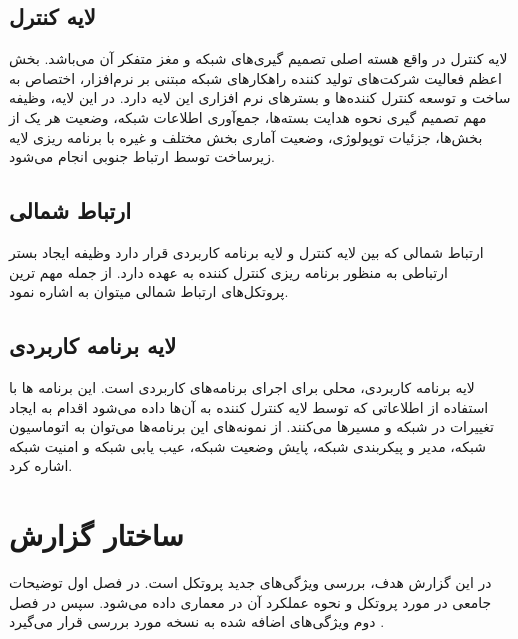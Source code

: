 \subsection{لایه کنترل}
لایه کنترل در واقع هسته اصلی تصمیم گیری‌های شبکه و مغز متفکر آن می‌باشد. بخش اعظم فعالیت شرکت‌های تولید کننده‌ راهکار‌های شبکه‌ مبتنی بر نرم‌افزار، اختصاص به ساخت و توسعه کنترل کننده‌ها و بستر‌های نرم افزاری این لایه دارد. در این لایه، وظیفه مهم تصمیم گیری نحوه هدایت بسته‌ها، جمع‌آوری اطلاعات شبکه، وضعیت هر یک از بخش‌ها، جزئیات توپولوژی، وضعیت آماری بخش مختلف و غیره با برنامه ریزی لایه زیرساخت توسط ارتباط جنوبی انجام می‌شود.

\subsection{ارتباط شمالی}
ارتباط شمالی که بین لایه کنترل و لایه برنامه کاربردی قرار دارد وظیفه ایجاد بستر ارتباطی به منظور برنامه ریزی کنترل کننده به عهده دارد. از جمله مهم ترین پروتکل‌های ارتباط شمالی میتوان به  اشاره نمود.

\subsection{لایه برنامه کاربردی}
لایه برنامه کاربردی، محلی برای اجرای برنامه‌های کاربردی است. این برنامه ها با استفاده از اطلاعاتی که توسط لایه کنترل کننده به آن‌ها داده می‌شود اقدام به ایجاد تغییرات در شبکه و مسیر‌ها می‌کنند. از نمونه‌های این برنامه‌ها می‌توان به اتوماسیون شبکه، مدیر و پیکربندی شبکه، پایش وضعیت شبکه، عیب یابی شبکه و امنیت شبکه اشاره کرد.

\section{ساختار گزارش}
در این گزارش هدف، بررسی ویژگی‌های جدید پروتکل  است. در فصل اول توضیحات جامعی در مورد پروتکل  و نحوه عملکرد آن در معماری  داده می‌شود. سپس در فصل دوم ویژگی‌های اضافه شده به نسخه‌  مورد بررسی قرار می‌گیرد .





